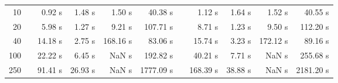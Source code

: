 {\begin{table}[h]
\begin{tabular}{rr rrrr r rrrr}
10 & & 0.92 s & 1.48 s & 1.50 s & 40.38 s && 1.12 s & 1.64 s & 1.52 s & 40.55 s \\ 
20 & & 5.98 s & 1.27 s & 9.21 s & 107.71 s && 8.71 s & 1.23 s & 9.50 s & 112.20 s \\ 
40 & & 14.18 s & 2.75 s & 168.16 s & 83.06 s && 15.74 s & 3.23 s & 172.12 s & 89.16 s \\ 
100 & & 22.22 s & 6.45 s &  NaN s & 192.82 s && 40.21 s & 7.71 s &  NaN s & 255.68 s \\ 
250 & & 91.41 s & 26.93 s &  NaN s & 1777.09 s && 168.39 s & 38.88 s &  NaN s & 2181.20 s \\ 
\hline 
\end{tabular} 
\end{table} 
} 
